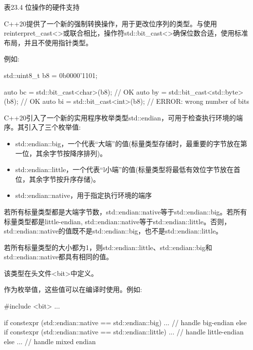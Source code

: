 \begin{center}
表23.4 位操作的硬件支持
\end{center}


C++20提供了一个新的强制转换操作，用于更改位序列的类型。与使用reinterpret\_cast<>或联合相比，操作符std::bit\_cast<>确保位数合适，使用标准布局，并且不使用指针类型。

例如:

\begin{cpp}
std::uint8_t b8 = 0b0000'1101;

auto bc = std::bit_cast<char>(b8); // OK
auto by = std::bit_cast<std::byte>(b8); // OK
auto bi = std::bit_cast<int>(b8); // ERROR: wrong number of bits
\end{cpp}


C++20引入了一个新的实用程序枚举类型std::endian，可用于检查执行环境的端序。其引入了三个枚举值:

\begin{itemize}
\item 
std::endian::big，一个代表“大端”的值(标量类型存储时，最重要的字节放在第一位，其余字节按降序排列)。

\item 
std::endian::little，一个代表“l小端”的值(标量类型将最低有效位字节放在首位，其余字节按升序存储)。

\item 
std::endian::native，用于指定执行环境的端序
\end{itemize}

若所有标量类型都是大端字节数，std::endian::native等于std::endian::big。若所有标量类型都是little-endian, std::endian::native等于std::endian::little。否则，std::endian::native的值既不是std::endian::big，也不是std::endian::little。

若所有标量类型的大小都为1，则std::endian::little、std::endian::big和std::endian::native都具有相同的值。

该类型在头文件<bit>中定义。

作为枚举值，这些值可以在编译时使用。例如:

\begin{cpp}
#include <bit>
...

if constexpr (std::endian::native == std::endian::big) {
	... // handle big-endian
}
else if constexpr (std::endian::native == std::endian::little) {
	... // handle little-endian
}
else {
	... // handle mixed endian
}
\end{cpp}









